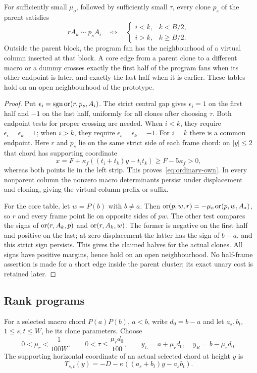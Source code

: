 \begin{lemma}\label{lem:ordinary-table}
For sufficiently small $\mu_o$, followed by sufficiently small $\tau$, every clone $p_s$ of the parent satisfies
\begin{equation}\label{eq:ordinary-own}
rA_k\sim p_sA_i\quad\Longleftrightarrow\quad
\begin{cases}i<k,&k<B/2,\\i>k,&k\geq B/2.\end{cases}
\end{equation}
Outside the parent block, the program fan has the neighbourhood of a virtual column inserted at that block. A core edge from a parent clone to a different macro or a dummy crosses exactly the first half of the program fans when its other endpoint is later, and exactly the last half when it is earlier. These tables hold on an open neighbourhood of the prototype.
\end{lemma}
\begin{proof}
Put $\epsilon_i=\operatorname{sgn}\operatorname{or}(r,p_s,A_i)$. The strict central gap gives $\epsilon_i=1$ on the first half and $-1$ on the last half, uniformly for all clones after choosing $\tau$. Both endpoint tests for proper crossing are needed. When $i<k$, they require $\epsilon_i=\epsilon_k=1$; when $i>k$, they require $\epsilon_i=\epsilon_k=-1$. For $i=k$ there is a common endpoint. Here $r$ and $p_s$ lie on the same strict side of each frame chord: on $|y|\leq2$ that chord has supporting coordinate
\[
x=F+\kappa_f((t_i+t_k)y-t_it_k)\geq F-5\kappa_f>0,
\]
whereas both points lie in the left strip. This proves~\eqref{eq:ordinary-own}. In every nonparent column the nonzero macro determinants persist under displacement and cloning, giving the virtual-column prefix or suffix.

For the core table, let $w=P(b)$ with $b\ne a$. Then
$\operatorname{or}(p,w,r)=-\mu_o\operatorname{or}(p,w,A_*)$, so $r$ and every frame point lie on opposite sides of $pw$. The other test compares the signs of $\operatorname{or}(r,A_k,p)$ and $\operatorname{or}(r,A_k,w)$. The former is negative on the first half and positive on the last; at zero displacement the latter has the sign of $b-a$, and this strict sign persists. This gives the claimed halves for the actual clones. All signs have positive margins, hence hold on an open neighbourhood. No half-frame assertion is made for a short edge inside the parent cluster; its exact unary cost is retained later.
\end{proof}

\subsection{Rank programs}
For a selected macro chord $P(a)P(b)$, $a<b$, write $d_0=b-a$ and let $a_s,b_t$, $1\leq s,t\leq W$, be its clone parameters. Choose
\[
0<\mu_r<\frac1{100W},\qquad 0<\tau\leq\frac{\mu_rd_0}{100},\qquad
y_L=a+\mu_rd_0,\quad y_R=b-\mu_rd_0.
\]
The supporting horizontal coordinate of an actual selected chord at height $y$ is
\begin{equation}\label{eq:rank-support}
T_{s,t}(y)=-D-\kappa((a_s+b_t)y-a_sb_t).
\end{equation}

